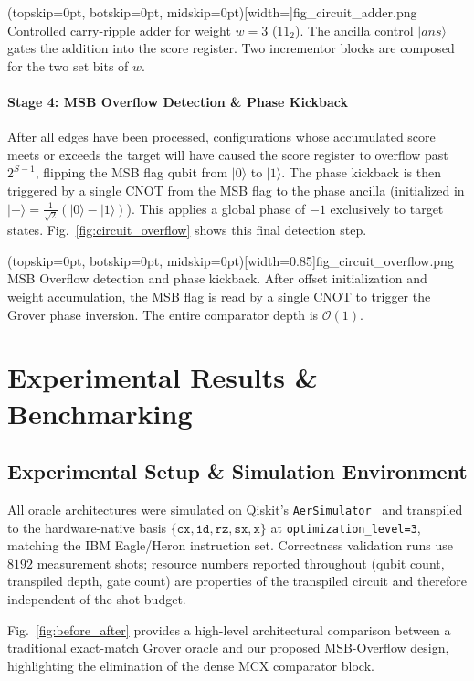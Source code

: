 \documentclass{ieeeaccess}
\begin{document}
\Figure[t!](topskip=0pt, botskip=0pt, midskip=0pt)[width=\columnwidth]{fig_circuit_adder.png}
{Controlled carry-ripple adder for weight $w=3$ ($11_2$). The ancilla control $|ans\rangle$ gates the addition into the score register. Two incrementor blocks are composed for the two set bits of $w$.\label{fig:circuit_adder}}

\paragraph{Stage 4: MSB Overflow Detection \& Phase Kickback}
After all edges have been processed, configurations whose accumulated score meets or exceeds the target will have caused the score register to overflow past $2^{S-1}$, flipping the MSB flag qubit from $|0\rangle$ to $|1\rangle$. The phase kickback is then triggered by a single CNOT from the MSB flag to the phase ancilla (initialized in $|-\rangle = \frac{1}{\sqrt{2}}(|0\rangle - |1\rangle)$). This applies a global phase of $-1$ exclusively to target states. Fig.~\ref{fig:circuit_overflow} shows this final detection step.

\Figure[t!](topskip=0pt, botskip=0pt, midskip=0pt)[width=0.85\columnwidth]{fig_circuit_overflow.png}
{MSB Overflow detection and phase kickback. After offset initialization and weight accumulation, the MSB flag is read by a single CNOT to trigger the Grover phase inversion. The entire comparator depth is $\mathcal{O}(1)$.\label{fig:circuit_overflow}}

\section{Experimental Results \& Benchmarking}
\label{sec:benchmarks}

\subsection{Experimental Setup \& Simulation Environment}
All oracle architectures were simulated on Qiskit's \texttt{AerSimulator}~\cite{qiskit2023} and transpiled to the hardware-native basis $\{\texttt{cx}, \texttt{id}, \texttt{rz}, \texttt{sx}, \texttt{x}\}$ at \texttt{optimization\_level=3}, matching the IBM Eagle/Heron instruction set. Correctness validation runs use $8192$ measurement shots; resource numbers reported throughout (qubit count, transpiled depth, gate count) are properties of the transpiled circuit and therefore independent of the shot budget.

Fig.~\ref{fig:before_after} provides a high-level architectural comparison between a traditional exact-match Grover oracle and our proposed MSB-Overflow design, highlighting the elimination of the dense MCX comparator block.
\end{document}
